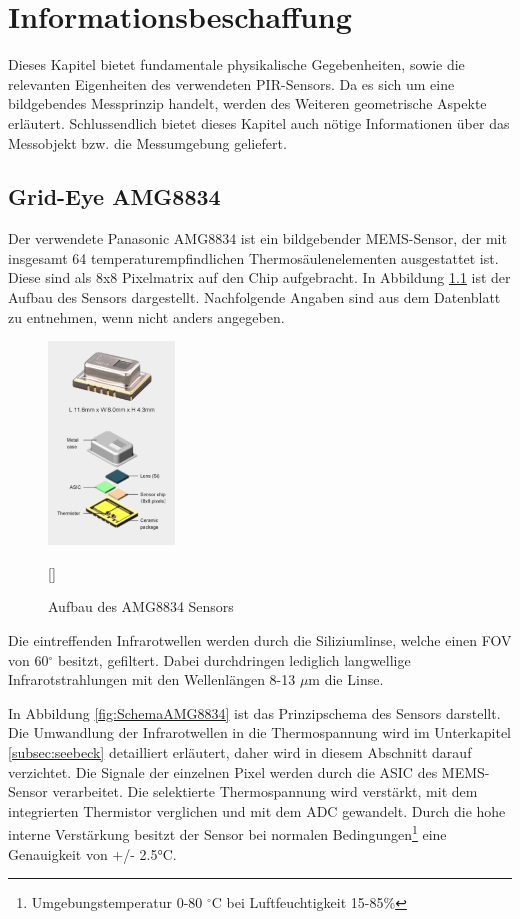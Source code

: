 \chapter{Informationsbeschaffung}
\label{chap:Informationsbeschaffung}
Dieses Kapitel bietet fundamentale physikalische Gegebenheiten, sowie die relevanten Eigenheiten des verwendeten \ac{PIR}-Sensors. Da es sich um eine bildgebendes Messprinzip handelt, werden des Weiteren geometrische Aspekte erläutert. Schlussendlich bietet dieses Kapitel auch nötige Informationen über das Messobjekt bzw. die Messumgebung geliefert.

\section{Grid-Eye AMG8834}
\label{sec:AMG8834}

Der verwendete Panasonic AMG8834 ist ein bildgebender \ac{MEMS}-Sensor, der mit insgesamt 64 temperaturempfindlichen Thermosäulenelementen ausgestattet ist. Diese sind als 8x8 Pixelmatrix auf den Chip aufgebracht. In Abbildung \ref{fig:Explosionsdarstellung} ist der Aufbau des Sensors dargestellt. Nachfolgende Angaben sind aus dem Datenblatt zu entnehmen, wenn nicht anders angegeben.
 
\begin{figure}[H]
	\centering
	\includegraphics[width=0.3\textwidth]
	{fig/grid_eye_aufbau.PNG}
	\caption[Aufbau des AMG8834 Sensors]{Aufbau des AMG8834 Sensors} []\protect\cite{AMG8834]}
	\label{fig:Explosionsdarstellung}
\end{figure}
Die eintreffenden Infrarotwellen werden durch die Siliziumlinse, welche einen \ac{FOV} von 60$^\circ$ besitzt, gefiltert. Dabei durchdringen lediglich langwellige Infrarotstrahlungen mit den Wellenlängen 8-13 $\mu$m die Linse. 

In Abbildung \ref{fig:SchemaAMG8834} ist das Prinzipschema des Sensors darstellt. Die Umwandlung der Infrarotwellen in die Thermospannung wird im Unterkapitel \ref{subsec:seebeck} detailliert erläutert, daher wird in diesem Abschnitt darauf verzichtet. Die Signale der einzelnen Pixel werden durch die \ac{ASIC} des \ac{MEMS}-Sensor verarbeitet. Die selektierte Thermospannung wird verstärkt, mit dem integrierten Thermistor verglichen und mit dem \ac{ADC} gewandelt. Durch die hohe interne Verstärkung besitzt der Sensor bei normalen Bedingungen\footnote[1]{Umgebungstemperatur 0-80 $^\circ$C bei Luftfeuchtigkeit 15-85\%} eine Genauigkeit von +/- 2.5°C. 

